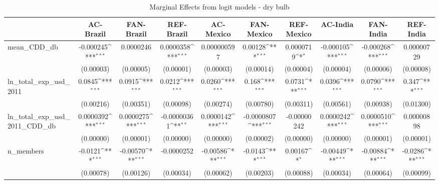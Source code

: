 \begin{table}[htbp]\centering
\def\sym#1{\ifmmode^{#1}\else\(^{#1}\)\fi}
\caption{Marginal Effects from logit models - dry bulb}
\begin{tabular}{l*{9}{c}}
\hline\hline
            &\multicolumn{1}{c}{AC-Brazil}&\multicolumn{1}{c}{FAN-Brazil}&\multicolumn{1}{c}{REF-Brazil}&\multicolumn{1}{c}{AC-Mexico}&\multicolumn{1}{c}{FAN-Mexico}&\multicolumn{1}{c}{REF-Mexico}&\multicolumn{1}{c}{AC-India}&\multicolumn{1}{c}{FAN-India}&\multicolumn{1}{c}{REF-India}\\
\hline
mean\_CDD\_db &   -0.000245\sym{***}&   0.0000246         &   0.0000358\sym{***}& 0.000000597         &     0.00128\sym{***}&   0.0000719\sym{*}  &   -0.000105\sym{***}&   -0.000268\sym{***}&  0.00000729         \\
            &   (0.00003)         &   (0.00005)         &   (0.00001)         &   (0.00003)         &   (0.00014)         &   (0.00004)         &   (0.00004)         &   (0.00006)         &   (0.00008)         \\
ln\_total\_exp\_usd\_2011&      0.0845\sym{***}&      0.0915\sym{***}&      0.0212\sym{***}&      0.0260\sym{***}&       0.168\sym{***}&      0.0731\sym{***}&      0.0396\sym{***}&      0.0790\sym{***}&       0.347\sym{***}\\
            &   (0.00216)         &   (0.00351)         &   (0.00098)         &   (0.00274)         &   (0.00780)         &   (0.00311)         &   (0.00561)         &   (0.00938)         &   (0.01300)         \\
ln\_total\_exp\_usd\_2011\_CDD\_db&   0.0000392\sym{***}&   0.0000275\sym{***}& -0.00000361\sym{**} &   0.0000142\sym{***}&  -0.0000807\sym{***}& -0.00000242         &   0.0000242\sym{***}&   0.0000510\sym{***}&  0.00000898         \\
            &   (0.00000)         &   (0.00001)         &   (0.00000)         &   (0.00000)         &   (0.00002)         &   (0.00000)         &   (0.00000)         &   (0.00001)         &   (0.00001)         \\
n\_members   &     -0.0121\sym{***}&    -0.00570\sym{***}&  -0.0000252         &    -0.00586\sym{***}&     -0.0143\sym{***}&     0.00167\sym{*}  &    -0.00449\sym{***}&    -0.00884\sym{***}&     -0.0286\sym{***}\\
            &   (0.00078)         &   (0.00126)         &   (0.00034)         &   (0.00062)         &   (0.00203)         &   (0.00088)         &   (0.00034)         &   (0.00064)         &   (0.00099)         \\

\end{tabular}
\end{table}
